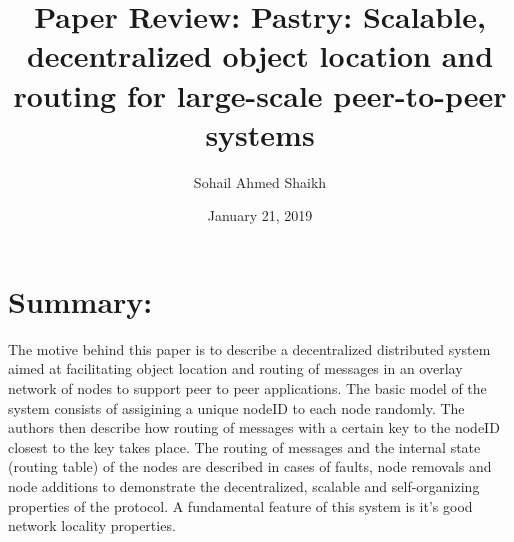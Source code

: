 \documentclass[12pt]{article}
\title{Paper Review: Pastry: Scalable, decentralized object location and routing for large-scale peer-to-peer systems}
\author{Sohail Ahmed Shaikh}
\date{January 21, 2019}
\begin{document}
 
\maketitle
\section{Summary:}
The motive behind this paper is to describe a decentralized distributed system aimed at facilitating object location and routing of messages in an overlay network of nodes to support peer to peer applications. The basic model of the system consists of assigining a unique nodeID to each node randomly. The authors then describe how routing of messages with a certain key to the nodeID closest to the key takes place. The routing of messages and the internal state (routing table) of the nodes are described in cases of faults, node removals and node additions to demonstrate the decentralized, scalable and self-organizing properties of the protocol. A fundamental feature of this system is it's good network locality properties.
\end{document}
